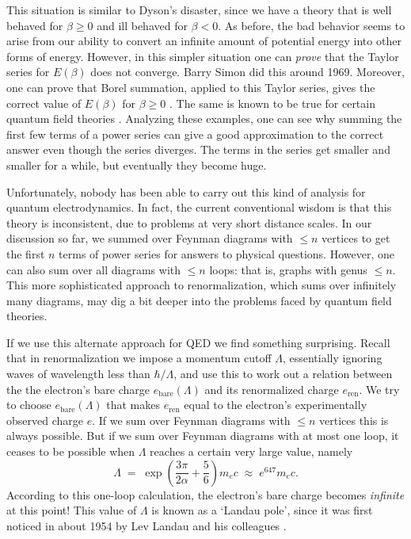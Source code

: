 \documentclass[12pt]{article}
\newcommand{\bare}{\mathrm{bare}}
\newcommand{\ren}{\mathrm{ren}}
\begin{document}
This situation is similar to Dyson's disaster, since we have a theory that is well behaved for $\beta \ge 0$ and ill behaved for $\beta < 0$.  As before, the bad behavior seems to arise from our ability to convert an infinite amount of potential energy into other forms of energy.    However, in this simpler situation one can \emph{prove} that the Taylor series for $E(\beta)$ does not converge.  Barry Simon \cite{Simon1970} did this around 1969.  Moreover, one can prove that Borel summation, applied to this Taylor series, gives the correct value of $E(\beta)$ for $\beta \ge 0$ \cite{GGS}.  The same is known to be true for certain quantum field theories \cite{Rivasseau}.  Analyzing these examples, one can see why summing the first few terms of a power series can give a good approximation to the correct answer even though the series diverges.   The terms in the series get smaller and smaller for a while, but eventually they become huge.

Unfortunately, nobody has been able to carry out this kind of analysis for quantum electrodynamics.  In fact, the current conventional wisdom is that this theory is inconsistent, due to problems at very short distance scales.   In our discussion so far, we summed over Feynman diagrams with $\le n$ vertices to get the first $n$ terms of power series for answers to physical questions.  However, one can also sum over all diagrams with $\le n$ loops: that is, graphs with genus $\le n$.  This more sophisticated approach to renormalization, which sums over infinitely many diagrams, may dig a bit deeper into the problems faced by quantum field theories.   

If we use this alternate approach for QED we find something surprising.  Recall that
in renormalization we impose a momentum cutoff $\Lambda$, essentially ignoring waves of wavelength less than $\hbar/\Lambda$, and use this to work out a relation between the
the electron's bare charge $e_\bare(\Lambda)$ and its renormalized charge $e_\ren$.
We try to choose $e_\bare(\Lambda)$ that makes $e_\ren$ equal to the electron's experimentally observed charge $e$.   If we sum over Feynman diagrams with $\le n$ vertices this is always possible.  But if we sum over Feynman diagrams with at most one loop, it ceases to be possible when $\Lambda$ reaches a certain very large value, namely
\[     \Lambda \; = \; \exp\left(\frac{3 \pi}{2 \alpha} + \frac{5}{6}\right) m_e c \; \approx \; e^{647} m_e c. \] 
According to this one-loop calculation, the electron's bare charge becomes \emph{infinite} at this point!    This value of $\Lambda$ is known as a `Landau pole', since it was first noticed in about 1954 by Lev Landau and his colleagues \cite{Landau}.  
\end{document}
